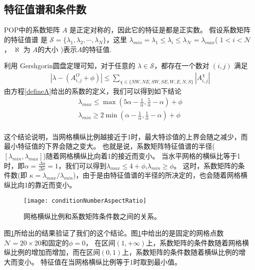 \subsection{特征值谱和条件数}
\label{solver:Algorithm:condition}

POP中的系数矩阵 $A$ 是正定对称的\cite{smith2010parallel}，因此它的特征是都是正实数\cite{stewart1976positive}。
假设系数矩阵的特征值谱\cite{golub2012matrix} 是 $\mathcal{S} = \{\lambda_1, \lambda_2, \cdots, \lambda_N\}$，这里 $\lambda_{min} = \lambda_1 \le \lambda_i \le \lambda_\mathcal{N} = \lambda_{max}$( $1<i <\mathcal{N}$， $\aleph$ 为 $A$的大小 )表示$A$的特征值.

利用 Gershgorin圆盘定理\cite{bell1965gershgorin}可知，对于任意的 $\lambda \in \mathcal{S}$，都存在一个数对 $(i,j)$ 满足
\begin{align}
&|\lambda -  (A_{i,j}^O + \phi ) | \le \sum_{\chi \in \{NW,NE,SW,SE,W,E,N,S\}}|A_{i,j}^\chi|
\end{align}
由方程\ref{defineA}给出的系数的定义，我们可以得到如下结论 
\begin{align} \label{eigsGersh}
&\lambda_{max} \le  \max (  5\alpha - \frac{1}{\alpha}, \frac{5}{\alpha}- \alpha) +\phi   \\
&\lambda_{min} \ge 2\min (  \alpha - \frac{1}{\alpha},\frac{1} {\alpha} -  \alpha) + \phi
\end{align}\\

 
这个结论说明，当网格横纵比例越接近于1时，最大特诊值的上界会随之减少，而最小特征值的下界会随之变大。
也就是说，系数矩阵特征值谱的半径($[\lambda_{min}, \lambda_{max}]$)随着网格横纵比向着1的接近而变小。 
当水平网格的横纵比等于1时，即$ \alpha = \frac{ \Delta y}{ \Delta x} = 1$，我们可以得到$\lambda_{max} \le  4 +\phi$,$\lambda_{min} \ge   \phi$。
这时，系数矩阵的条件数(即 $\kappa=  \lambda_{max}/\lambda_{min}$)，由于是由特征值谱的半径的所决定的，也会随着网格横纵比向1的靠近而变小。 

\begin{figure}[ht]
\centering
\texttt{[image: conditionNumberAspectRatio]}
\caption[] {网格横纵比例和系数矩阵条件数之间的关系。 \label{fig:conditionNumberRatio}}
\end{figure}




图\ref{fig:conditionNumberRatio}所给出的结果验证了我们的这个结论。图\ref{fig:conditionNumberRatio}中给出的是固定的网格点数$\mathcal{N} = 20\times 20$和固定的$\phi = 0$， 在区间$(1, +\infty)$上，系数矩阵的条件数随着网格横纵比例的增加而增加，而在区间$(0,1)$上，系数矩阵的条件数随着横纵比例的增大而变小。
特征值在当网格横纵比例等于1时取到最小值。
 
